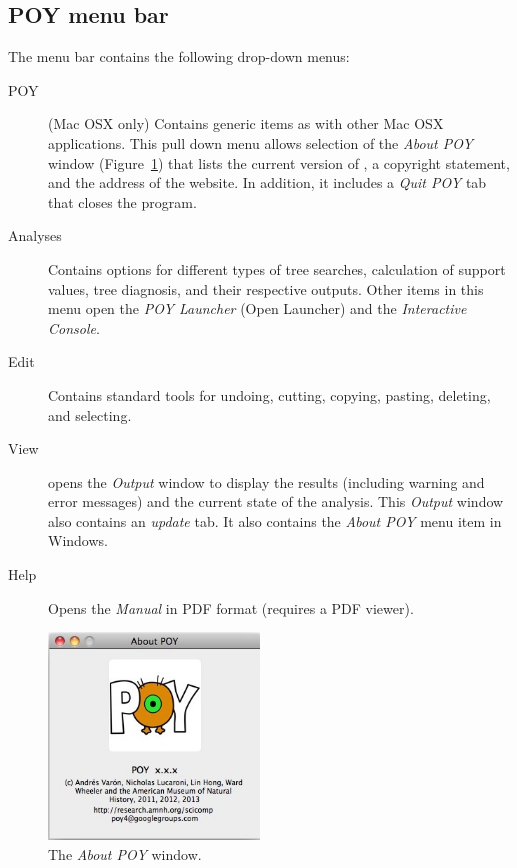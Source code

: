 \subsection{POY menu bar}
The menu bar contains the following drop-down menus:
\begin{description}
\item[POY] (Mac OSX only) Contains generic items as with other Mac OSX applications. This pull down 
menu allows selection of the \emph{About POY} window (Figure~\ref{fig:about_window}) that lists the 
current version of \poy, a copyright statement, and the address of the \poy website. In addition, it includes 
a \emph{Quit POY} tab that closes the program. 
\item[Analyses]    Contains options for different types of tree searches, calculation of support values, tree 
diagnosis, and their respective outputs. Other items in this menu open the \emph{POY Launcher} 
(Open Launcher) and the \emph{Interactive Console}.
\item[Edit] Contains standard tools for undoing, cutting, copying, pasting, deleting, and selecting.
\item[View] opens the \emph{Output} window to display the results (including warning and error messages) 
and the current state of the analysis. This \emph{Output} window also contains an \emph{update} tab.  
It also contains the \emph{About POY} menu item in Windows. %
\item[Help] Opens the \poy \emph{Manual} in PDF format (requires a PDF viewer).
\end{description}

\begin{figure}[htpb]
    \begin{center}
        \includegraphics[width=0.5\textwidth]{doc/figures/about_window.jpg}
    \end{center}
    \caption{The \emph{About POY} window.}
    \label{fig:about_window}
        
\end{figure}

